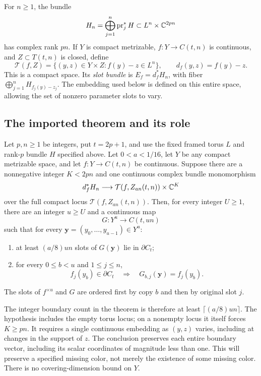 For $n\ge1$, the bundle
\[
 H_n=\bigoplus_{j=1}^n\operatorname{pr}_j^*H
            \subset L^n\times\mathbb C^{2pn}
\]
has complex rank $pn$. If $Y$ is compact metrizable, $f:Y\to C(t,n)$
is continuous, and $Z\subset T(t,n)$ is closed, define
\[
 \mathcal T(f,Z)=\{(y,z)\in Y\times Z:f(y)-z\in L^n\},
 \qquad d_f(y,z)=f(y)-z.
\]
This is a compact space. Its \emph{slot bundle} is
$E_f=d_f^*H_n$, with fiber
$\bigoplus_{j=1}^n H_{f_j(y)-z_j}$. The embedding used below is defined
on this entire space, allowing the set of nonzero parameter slots to
vary.

\subsection{The imported theorem and its role}

\begin{theorem}
\label{thm:torus-compression}
Let $p,n\ge1$ be integers, put $t=2p+1$, and use the fixed framed
torus $L$ and rank-$p$ bundle $H$ specified above. Let $0<a<1/16$,
let $Y$ be any compact metrizable space, and let $f:Y\to C(t,n)$
be continuous. Suppose there are a nonnegative integer $K<2pn$ and
one continuous complex bundle monomorphism
\[
 d_f^*H_n\longrightarrow
       \mathcal T(f,Z_{an}(t,n))\times\mathbb C^K
\]
over the full compact locus $\mathcal T(f,Z_{an}(t,n))$.
Then, for every integer $U\ge1$, there are an integer $u\ge U$ and
a continuous map
\[
 G:Y^u\longrightarrow C(t,un)
\]
such that for every $\mathbf y=(y_0,\ldots,y_{u-1})\in Y^u$:
\begin{enumerate}
\item at least $(a/8)un$ slots of $G(\mathbf y)$ lie in $\partial C_t$;
\item for every $0\le b<u$ and $1\le j\le n$,
\[
 f_j(y_b)\in\partial C_t
       \quad\Longrightarrow\quad G_{b,j}(\mathbf y)=f_j(y_b).
\]
\end{enumerate}
The slots of $f^{\times u}$ and $G$ are ordered first by copy $b$
and then by original slot $j$.
\end{theorem}

The integer boundary count in the theorem is therefore at least
$\lceil(a/8)un\rceil$. The hypothesis includes the empty torus locus;
on a nonempty locus it itself forces $K\ge pn$. It requires a single
continuous embedding as $(y,z)$ varies, including at changes in the
support of $z$. The conclusion preserves each entire boundary vector,
including its scalar coordinates of magnitude less than one. This
will preserve a specified missing color, not merely the existence
of some missing color. There is no covering-dimension bound on $Y$.

